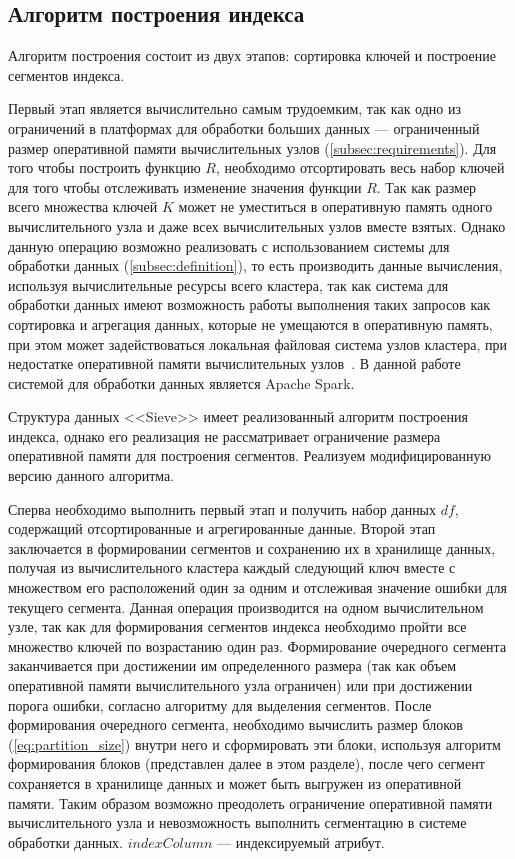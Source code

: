 \subsection{Алгоритм построения индекса}\label{build}

Алгоритм построения состоит из двух этапов: сортировка ключей и построение сегментов индекса.

Первый этап является вычислительно самым трудоемким, так как одно из ограничений в платформах для обработки больших данных --- ограниченный размер оперативной памяти вычислительных узлов (\ref{subsec:requirements}). Для того чтобы построить функцию $R$, необходимо отсортировать весь набор ключей для того чтобы отслеживать изменение значения функции $R$. Так как размер всего множества ключей $K$ может не уместиться в оперативную память одного вычислительного узла и даже всех вычислительных узлов вместе взятых. Однако данную операцию возможно реализовать с использованием системы для обработки данных (\ref{subsec:definition}), то есть производить данные вычисления, используя вычислительные ресурсы всего кластера, так как система для обработки данных имеют возможность работы выполнения таких запросов как сортировка и агрегация данных, которые не умещаются в оперативную память, при этом может задействоваться локальная файловая система узлов кластера, при недостатке оперативной памяти вычислительных узлов~\cite{Impact_of_memory_size_on_bigdata}. В данной работе системой для обработки данных является Apache Spark.

Структура данных {<<Sieve>>} имеет реализованный алгоритм построения индекса, однако его реализация не рассматривает ограничение размера оперативной памяти для построения сегментов. Реализуем модифицированную версию данного алгоритма.

Сперва необходимо выполнить первый этап и получить набор данных $df$, содержащий отсортированные и агрегированные данные. Второй этап заключается в формировании сегментов и сохранению их в хранилище данных, получая из вычислительного кластера каждый следующий ключ вместе с множеством его расположений один за одним и отслеживая значение ошибки для текущего сегмента. Данная операция производится на одном вычислительном узле, так как для формирования сегментов индекса необходимо пройти все множество ключей по возрастанию один раз. Формирование очередного сегмента заканчивается при достижении им определенного размера (так как объем оперативной памяти вычислительного узла ограничен) или при достижении порога ошибки, согласно алгоритму для выделения сегментов. После формирования очередного сегмента, необходимо вычислить размер блоков (\ref{eq:partition_size}) внутри него и сформировать эти блоки, используя алгоритм формирования блоков (представлен далее в этом разделе), после чего сегмент сохраняется в хранилище данных и может быть выгружен из оперативной памяти. Таким образом возможно преодолеть ограничение оперативной памяти вычислительного узла и невозможность выполнить сегментацию в системе обработки данных. $indexColumn$ --- индексируемый атрибут.

